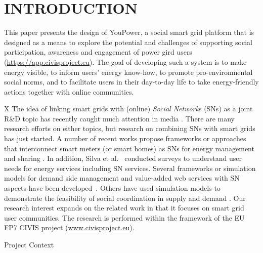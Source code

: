 \section{\uppercase{Introduction}}
\label{sec:introduction}

\noindent 
This paper presents the design of YouPower, a social smart grid platform that is designed as a means to explore the potential and challenges of supporting social participation, awareness and engagement of power gird users (\url{https://app.civisproject.eu}). The goal of developing such a system is to make energy visible, to inform users' energy know-how, to promote
pro-environmental social norms, and to facilitate users in their day-to-day life to take energy-friendly actions together with online communities. 

X The idea of linking smart grids with (online) \textit{Social Network}s (SNs) as a joint R\&D topic has recently caught
much attention in media
\cite{Boslet2010,Chima2011,Erickson2012,Fang2013}. There are many
research efforts on either topics, but research on combining SNs with
smart grids has just started. A number of recent works propose frameworks or
approaches that interconnect smart meters (or smart homes) as SNs for
energy management and sharing \cite{Ciuciu2012,Steinheimer2012}. In
addition, Silva et al.~\cite{Silva2012} conducted surveys to
understand user needs for energy services including SN
services. Several frameworks or simulation models for demand side
management and value-added web services with SN aspects have been
developed~\cite{Chatzidimitriou2013,De-Haan2011,Lei2012}. Others have
used simulation models to demonstrate the feasibility of social
coordination in supply and demand \cite{Skopik2014,Worm2013}.
% 
Our research interest expands on the related work in that it focuses
on smart grid user communities. The research is performed within the
framework of the EU FP7 CIVIS
project (\url{www.civisproject.eu}).

Project Context 
